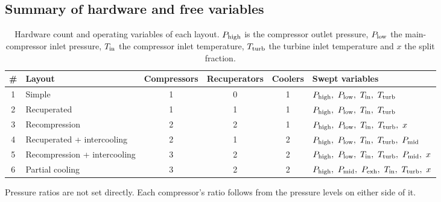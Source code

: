 
\subsection{Summary of hardware and free variables}

\begin{table}[h]\centering\small\setlength{\tabcolsep}{3.5pt}
\begin{tabular}{clcccl}
\toprule
\# & Layout & Compressors & Recuperators & Coolers & Swept variables\\
\midrule
1 & Simple & 1 & 0 & 1 & $\Ph,\ \Pl,\ \Tin,\ \Tt$\\
2 & Recuperated & 1 & 1 & 1 & $\Ph,\ \Pl,\ \Tin,\ \Tt$\\
3 & Recompression & 2 & 2 & 1 & $\Ph,\ \Pl,\ \Tin,\ \Tt,\ x$\\
4 & Recuperated + intercooling & 2 & 1 & 2 & $\Ph,\ \Pl,\ \Tin,\ \Tt,\ \Pm$\\
5 & Recompression + intercooling & 3 & 2 & 2 & $\Ph,\ \Pl,\ \Tin,\ \Tt,\ \Pm,\ x$\\
6 & Partial cooling & 3 & 2 & 2 & $\Ph,\ \Pm,\ \Pe,\ \Tin,\ \Tt,\ x$\\
\bottomrule
\end{tabular}
\caption{Hardware count and operating variables of each layout. $P_\mathrm{high}$ is the compressor outlet pressure, $P_\mathrm{low}$ the main-compressor inlet pressure, $T_\mathrm{in}$ the compressor inlet temperature, $T_\mathrm{turb}$ the turbine inlet temperature and $x$ the split fraction.}\label{tab:layouts}
\end{table}

Pressure ratios are not set directly. Each compressor's ratio follows from the pressure levels on either side of it.

